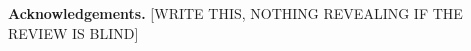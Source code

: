 \documentclass{llncs}
\begin{document}






\textbf{Acknowledgements.} [WRITE THIS, NOTHING REVEALING IF THE REVIEW IS BLIND]


\end{document}
